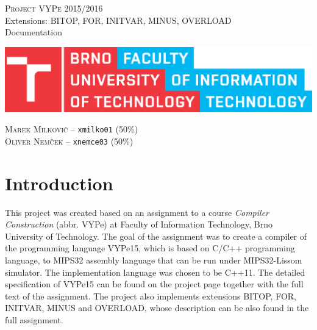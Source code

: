 \documentclass[12pt]{article}
\begin{document}
\nocite{*}
\begin{titlepage}
	\begin{center}
		\noindent\LARGE{\textsc{Project VYPe 2015/2016}} \\
		\scriptsize{Extensions: BITOP, FOR, INITVAR, MINUS, OVERLOAD} \\
		\Large{Documentation}
	\end{center}
	\vfill
	\begin{center}
		\includegraphics[scale=0.7]{FIT_logo.eps}
	\end{center}
	\vfill
	\textsc{Marek Milkovič} -- \texttt{xmilko01} (50\%) \\
	\textsc{Oliver Nemček} -- \texttt{xnemce03} (50\%)
\end{titlepage}
\thispagestyle{empty}
\tableofcontents
\clearpage

\setcounter{page}{1}
\section{Introduction}
This project was created based on an assignment to a course \emph{Compiler Construction} (abbr. VYPe) at Faculty of Information Technology, Brno University of Technology.
The goal of the assignment was to create a compiler of the programming language VYPe15, which is based on C/C++ programming language,
to MIPS32 assembly language that can be run under MIPS32-Lissom simulator. The implementation language was chosen to be C++11.
The detailed specification of VYPe15 can be found
on the project page together with the full text of the assignment. The project also implements extensions BITOP, FOR, INITVAR, MINUS
and OVERLOAD, whose description can be also found in the full assignment.
\end{document}
